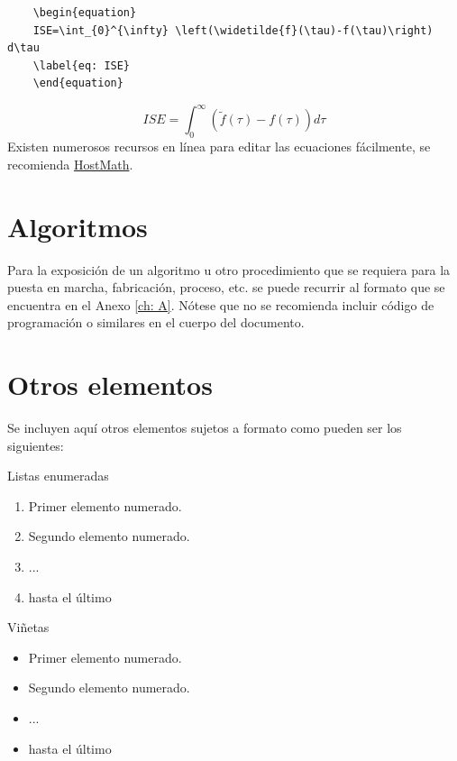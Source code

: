 \begin{lstlisting}
	\begin{equation}
	ISE=\int_{0}^{\infty} \left(\widetilde{f}(\tau)-f(\tau)\right) d\tau
	\label{eq: ISE}
	\end{equation}
\end{lstlisting}
\begin{equation}
	ISE=\int_{0}^{\infty} \left(\widetilde{f}(\tau)-f(\tau)\right) d\tau
	\label{eq: ISE}
\end{equation}
Existen numerosos recursos en línea para editar las ecuaciones fácilmente, se recomienda \href{http://www.hostmath.com/}{HostMath}.

\section{Algoritmos}
Para la exposición de un algoritmo u otro procedimiento que se requiera para la puesta en marcha, fabricación, proceso, etc. se puede recurrir al formato que se encuentra en el Anexo \ref{ch: A}. Nótese que no se recomienda incluir código de programación o similares en el cuerpo del documento.
\section{Otros elementos}
Se incluyen aquí otros elementos sujetos a formato como pueden ser los siguientes:


Listas enumeradas
\begin{enumerate}
	\item Primer elemento numerado.
	\item Segundo elemento numerado.
	\item ...
	\item hasta el último
\end{enumerate} 

Viñetas
\begin{itemize}
	\item Primer elemento numerado.
	\item Segundo elemento numerado.
	\item ...
	\item hasta el último
\end{itemize}